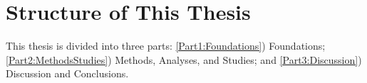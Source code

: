 \section{Structure of This Thesis} \label{sec:ThesisStructure}
This thesis is divided into three parts: 
  \ref{Part1:Foundations}) Foundations;
  \ref{Part2:MethodsStudies}) Methods, Analyses, and Studies;  and
  \ref{Part3:Discussion}) Discussion and Conclusions.
  
